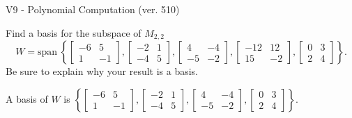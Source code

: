 \begin{exercise}
  \begin{exerciseTitle}V9 - Polynomial Computation (ver. 510)\end{exerciseTitle}
  \begin{exerciseStatement}
    Find a basis for the subspace of \(M_{2,2}\) 
\[W=\mathrm{span}\ \left\{\left[\begin{array}{cc}
-6 & 5 \\
1 & -1
\end{array}\right] , \left[\begin{array}{cc}
-2 & 1 \\
-4 & 5
\end{array}\right] , \left[\begin{array}{cc}
4 & -4 \\
-5 & -2
\end{array}\right] , \left[\begin{array}{cc}
-12 & 12 \\
15 & -2
\end{array}\right] , \left[\begin{array}{cc}
0 & 3 \\
2 & 4
\end{array}\right]\right\}.\]
 Be sure to explain why your result is a basis.


  \end{exerciseStatement}
  \begin{exerciseAnswer}
   A basis of \(W\) is  \(\left\{\left[\begin{array}{cc}
-6 & 5 \\
1 & -1
\end{array}\right] , \left[\begin{array}{cc}
-2 & 1 \\
-4 & 5
\end{array}\right] , \left[\begin{array}{cc}
4 & -4 \\
-5 & -2
\end{array}\right] , \left[\begin{array}{cc}
0 & 3 \\
2 & 4
\end{array}\right]\right\}\).
  


  \end{exerciseAnswer}
\end{exercise}